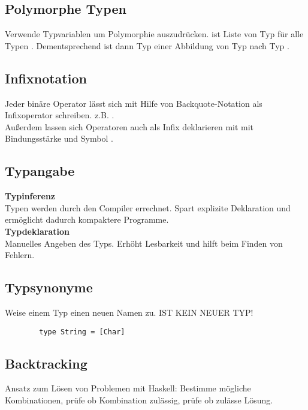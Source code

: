 \subsection{Polymorphe Typen}%
\label{hsk:sub:polymorphe-typen}
Verwende Typvariablen um Polymorphie auszudrücken.
\code{[t]} ist Liste von Typ  für alle Typen .
Dementsprechend ist dann  Typ einer Abbildung von Typ  nach Typ .
        
\subsection{Infixnotation}%
\label{hsk:sub:infixnotation}
Jeder binäre Operator lässt sich mit Hilfe von Backquote-Notation als Infixoperator schreiben.
z.B. .\\

Außerdem lassen sich Operatoren auch als Infix deklarieren mit  mit Bindungsstärke  und Symbol .

\subsection{Typangabe}%
\label{hsk:sub:typangabe}
\textbf{Typinferenz}\\
Typen werden durch den Compiler errechnet. Spart explizite Deklaration und ermöglicht dadurch kompaktere Programme.\\

\textbf{Typdeklaration}\\
Manuelles Angeben des Typs. Erhöht Lesbarkeit und hilft beim Finden von Fehlern.

\subsection{Typsynonyme}%
\label{hsk:sub:typsynonyme}
Weise einem Typ einen neuen Namen zu. IST KEIN NEUER TYP!
\begin{lstlisting}
        type String = [Char]
\end{lstlisting}

\subsection{Backtracking}%
\label{hsk:sub:backtracking}
Ansatz zum Lösen von Problemen mit Haskell:
Bestimme mögliche Kombinationen, prüfe ob Kombination zulässig, prüfe ob zulässe Lösung.

